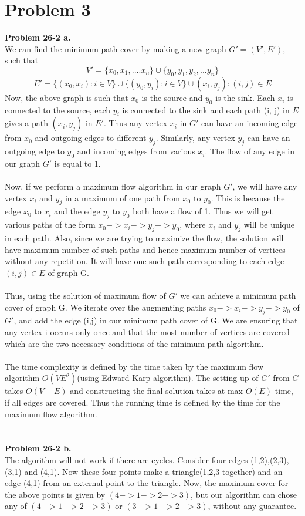 \documentclass[10pt]{article}
\begin{document}
\section*{Problem 3}
\textbf{Problem 26-2 a.}\\
We can find the minimum path cover by making a new graph $G' = (V', E')$, such that $$V' = \{x_0, x_1, .... x_n\}\cup\{y_0, y_1, y_2, ... y_n\}$$
$$E' = \{(x_0, x_i) : i \in V\}\cup\{(y_0, y_i): i \in V\}\cup{(x_i, y_j) : (i,j) \in E}$$
Now, the above graph is such that $x_0$ is the source and $y_0$ is the sink. Each $x_i$ is connected to the source, each $y_i$ is connected to the sink and each path (i, j) in $E$ gives a path $(x_i, y_j)$ in $E'$. Thus any vertex $x_i$ in $G'$ can have an incoming edge from $x_0$ and outgoing edges to different $y_j$. Similarly, any vertex $y_j$ can have an outgoing edge to $y_0$ and incoming edges from various $x_i$. The flow of any edge in our graph $G'$ is equal to 1.\\\\
Now, if we perform a maximum flow algorithm in our graph $G'$, we will have any vertex $x_i$ and $y_j$ in a maximum of one path from $x_0$ to $y_0$. This is because the edge $x_0$ to $x_i$ and the edge $y_j$ to $y_0$ both have a flow of 1. Thus we will get various paths of the form $x_0 -> x_i -> y_j -> y_0$, where $x_i$ and $y_j$ will be unique in each path. Also, since we are trying to maximize the flow, the solution will have maximum number of such paths and hence maximum number of vertices without any repetition. It will have one such path corresponding to each edge $(i,j)\in E$ of graph G.\\\\
Thus, using the solution of maximum flow of $G'$ we can achieve a minimum path cover of graph G. We iterate over the augmenting paths $x_0 -> x_i -> y_j -> y_0$ of $G'$, and add the edge (i,j) in our minimum path cover of G. We are ensuring that any vertex i occurs only once and that the most number of vertices are covered which are the two necessary conditions of the minimum path algorithm.\\\\
The time complexity is defined by the time taken by the maximum flow algorithm $O(VE^2)$(using Edward Karp algorithm). The setting up of $G'$ from $G$ takes $O(V+E)$ and constructing the final solution takes at max $O(E)$ time, if all edges are covered. Thus the running time is defined by the time for the maximum flow algorithm.\\\\\\
\textbf{Problem 26-2 b.}\\
The algorithm will not work if there are cycles. Consider four edges (1,2),(2,3),(3,1) and (4,1). Now these four points make a triangle(1,2,3 together) and an edge (4,1) from an external point to the triangle. Now, the maximum cover for the above points is given by $(4->1->2->3)$, but our algorithm can chose any of $(4->1->2->3)$ or $(3->1->2->3)$, without any guarantee. 
\newpage
\end{document}
